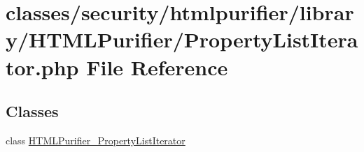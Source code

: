 \hypertarget{PropertyListIterator_8php}{\section{classes/security/htmlpurifier/library/\+H\+T\+M\+L\+Purifier/\+Property\+List\+Iterator.php File Reference}
\label{PropertyListIterator_8php}
}
\subsection*{Classes}
\begin{DoxyCompactItemize}
\item 
class \hyperlink{classHTMLPurifier__PropertyListIterator}{H\+T\+M\+L\+Purifier\+\_\+\+Property\+List\+Iterator}
\end{DoxyCompactItemize}
